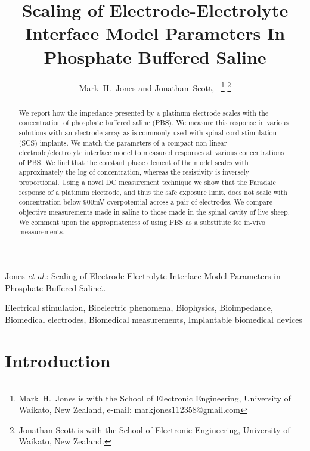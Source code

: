\documentclass[journal, a4paper]{IEEEtran}
\begin{document}
\title{Scaling of Electrode-Electrolyte Interface Model Parameters In Phosphate Buffered Saline}

\author{Mark~H.~Jones and Jonathan~Scott,~
    \thanks{Mark~H.~Jones is with the School of Electronic Engineering, University of Waikato, New Zealand, e-mail: markjones112358@gmail.com}%
\thanks{Jonathan Scott is with the School of Electronic Engineering, University of Waikato, New Zealand.}
}

{Jones \MakeLowercase{\textit{et al.}}: Scaling of Electrode-Electrolyte Interface Model Parameters in Phosphate Buffered Saline\...}
\maketitle



\begin{abstract}
We report how the impedance presented by a platinum electrode scales with the concentration of phosphate buffered saline (PBS).
{
    \color{blue}
    We measure this response in various solutions with an electrode array as is commonly used with spinal cord stimulation (SCS) implants. We match the parameters of a compact non-linear electrode/electrolyte interface model to measured responses at various concentrations of PBS.
}
We find that the constant phase element of the model scales with approximately the log of concentration, whereas the resistivity is inversely proportional.
Using a novel DC measurement technique we show that the Faradaic response of a platinum electrode, and thus the safe exposure limit, does not scale with concentration below 900\thinspace mV overpotential across a pair of electrodes.
We compare objective measurements made in saline to those made in the spinal cavity of live sheep. We comment upon the appropriateness of using PBS as a substitute for in-vivo measurements.
\end{abstract}

\begin{IEEEkeywords}
    Electrical stimulation, Bioelectric phenomena, Biophysics, Bioimpedance, Biomedical electrodes, Biomedical measurements, Implantable biomedical devices
\end{IEEEkeywords}




\section{Introduction}
\end{document}
